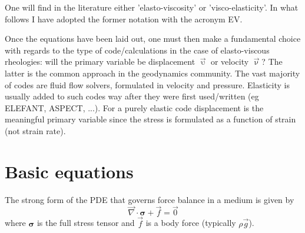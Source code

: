 One will find in the literature either 'elasto-viscosity' or 'visco-elasticity'.
In what follows I have adopted the former notation with the acronym EV.

Once the equations have been laid out, one must then make a fundamental choice 
with regards to the type of code/calculations in the case of elasto-viscous
rheologies: will the primary variable be displacement $\vec{\upupsilon}$ or velocity $\vec\upnu$?
The latter is the common approach in the geodynamics community. The vast majority
of codes are fluid flow solvers, formulated in velocity and pressure. 
Elasticity is usually added to such codes way after they were first used/written (eg ELEFANT, ASPECT, ...). 
For a purely elastic code displacement is the meaningful primary variable since the stress 
is formulated as a function of strain (not strain rate). 






\section{Basic equations}

The strong form of the PDE that governs force balance in a medium is given by
\[
\vec{\nabla}\cdot{\bm \sigma}  + \vec{f} = \vec{0}
\]
where ${\bm \sigma}$ is the full stress tensor and $\vec{f}$ is a body force
(typically $\rho \vec{g}$).

